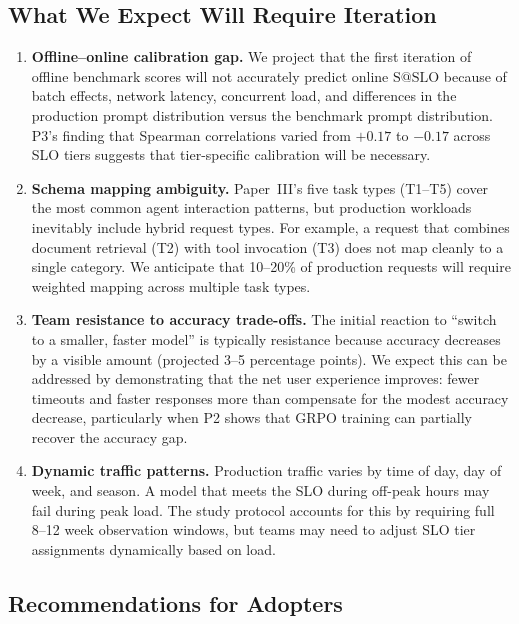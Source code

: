 \documentclass[11pt]{article}
\makeatletter
\newcommand{\sslo}{\ensuremath{\mathrm{S@SLO}}}
\makeatother
\begin{document}
\subsection{What We Expect Will Require Iteration}

\begin{enumerate}[leftmargin=16pt]
    \item \textbf{Offline--online calibration gap.} We project that the first iteration of offline benchmark scores will not accurately predict online $\sslo{}$ because of batch effects, network latency, concurrent load, and differences in the production prompt distribution versus the benchmark prompt distribution. P3's finding that Spearman correlations varied from $+0.17$ to $-0.17$ across SLO tiers suggests that tier-specific calibration will be necessary.

    \item \textbf{Schema mapping ambiguity.} Paper~III's five task types (T1--T5) cover the most common agent interaction patterns, but production workloads inevitably include hybrid request types. For example, a request that combines document retrieval (T2) with tool invocation (T3) does not map cleanly to a single category. We anticipate that 10--20\% of production requests will require weighted mapping across multiple task types.

    \item \textbf{Team resistance to accuracy trade-offs.} The initial reaction to ``switch to a smaller, faster model'' is typically resistance because accuracy decreases by a visible amount (projected 3--5 percentage points). We expect this can be addressed by demonstrating that the net user experience improves: fewer timeouts and faster responses more than compensate for the modest accuracy decrease, particularly when P2 shows that GRPO training can partially recover the accuracy gap.

    \item \textbf{Dynamic traffic patterns.} Production traffic varies by time of day, day of week, and season. A model that meets the SLO during off-peak hours may fail during peak load. The study protocol accounts for this by requiring full 8--12 week observation windows, but teams may need to adjust SLO tier assignments dynamically based on load.
\end{enumerate}

\subsection{Recommendations for Adopters}
\end{document}
